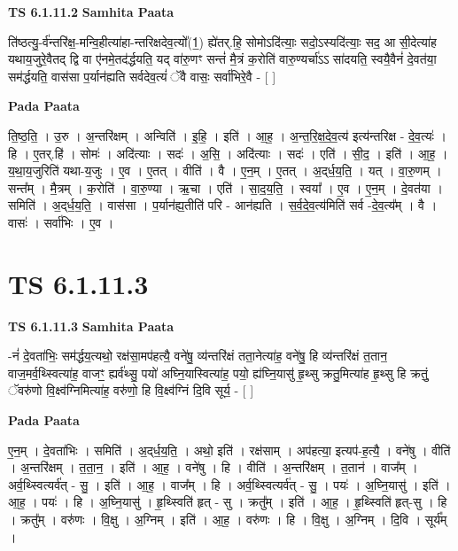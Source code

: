 \documentclass[17pt]{extarticle}
\begin{document}
\textbf{TS 6.1.11.2 } \newline
\textbf{Samhita Paata} \newline

ति॑ष्ठत्यु॒-र्व॑न्तरि॑क्ष॒-मन्वि॒हीत्या॑हा-न्तरिक्षदेव॒त्यो᳚(1॒) ह्ये॑तर्.हि॒ सोमोऽदि॑त्याः॒ सदो॒ऽस्यदि॑त्याः॒ सद॒ आ सी॒देत्या॑ह यथाय॒जुरे॒वैतद् द्वि वा ए॑नमे॒तद॑र्द्धयति॒ यद् वा॑रु॒णꣳ सन्तं॑ मै॒त्रं क॒रोति॑ वारु॒ण्यर्चा॑ऽऽ सा॑दयति॒ स्वयै॒वैनं॑ दे॒वत॑या॒ सम॑र्द्धयति॒ वास॑सा प॒र्यान॑ह्यति सर्वदेव॒त्यं॑ ॅवै वासः॒ सर्वा॑भिरे॒वै - [  ] \newline

\textbf{Pada Paata} \newline

ति॒ष्ठ॒ति॒ । उ॒रु । अ॒न्तरि॑क्षम् । अन्विति॑ । इ॒हि॒ । इति॑ । आ॒ह॒ । अ॒न्त॒रि॒क्ष॒दे॒व॒त्य॑ इत्य॑न्तरिक्ष - दे॒व॒त्यः॑ । हि । ए॒तर्.हि॑ । सोमः॑ । अदि॑त्याः । सदः॑ । अ॒सि॒ । अदि॑त्याः । सदः॑ । एति॑ । सी॒द॒ । इति॑ । आ॒ह॒ । य॒था॒य॒जुरिति॑ यथा-य॒जुः । ए॒व । ए॒तत् । वीति॑ । वै । ए॒न॒म् । ए॒तत् । अ॒द्‌र्ध॒य॒ति॒ । यत् । वा॒रु॒णम् । सन्त᳚म् । मै॒त्रम् । क॒रोति॑ । वा॒रु॒ण्या । ऋ॒चा । एति॑ । सा॒द॒य॒ति॒ । स्वया᳚ । ए॒व । ए॒न॒म् । दे॒वत॑या । समिति॑ । अ॒द्‌र्ध॒य॒ति॒ । वास॑सा । प॒र्यान॑ह्य॒तीति॑ परि - आन॑ह्यति । स॒र्व॒दे॒व॒त्य॑मिति॑ सर्व -दे॒व॒त्य᳚म् । वै । वासः॑ । सर्वा॑भिः । ए॒व ।  \newline




\section*{ TS 6.1.11.3 }

\textbf{TS 6.1.11.3 } \newline
\textbf{Samhita Paata} \newline

-नं॑ दे॒वता॑भिः॒ सम॑र्द्धय॒त्यथो॒ रक्ष॑सा॒मप॑हत्यै॒ वने॑षु॒ व्य॑न्तरि॑क्षं तता॒नेत्या॑ह॒ वने॑षु॒ हि व्य॑न्तरि॑क्षं त॒तान॒ वाज॒मर्व॒थ्स्वित्या॑ह॒ वाजꣳ॒॒ ह्यर्व॑थ्सु॒ पयो॑ अघ्नि॒यास्वित्या॑ह॒ पयो॒ ह्य॑घ्नि॒यासु॑ हृ॒थ्सु क्रतु॒मित्या॑ह हृ॒थ्सु हि क्रतुं॒ ॅवरु॑णो वि॒क्ष्व॑ग्निमित्या॑ह॒ वरु॑णो॒ हि वि॒क्ष्व॑ग्निं दि॒वि सूर्य॒ - [  ] \newline

\textbf{Pada Paata} \newline

ए॒न॒म् । दे॒वता॑भिः । समिति॑ । अ॒द्‌र्ध॒य॒ति॒ । अथो॒ इति॑ । रक्ष॑साम् । अप॑हत्या॒ इत्यप॑-ह॒त्यै॒ । वने॑षु । वीति॑ । अ॒न्तरि॑क्षम् । त॒ता॒न॒ । इति॑ । आ॒ह॒ । वने॑षु । हि । वीति॑ । अ॒न्तरि॑क्षम् । त॒तान॑ । वाज᳚म् । अर्व॒थ्स्वित्यर्व॑त् - सु॒ । इति॑ । आ॒ह॒ । वाज᳚म् । हि । अर्व॒थ्स्वित्यर्व॑त् - सु॒ । पयः॑ । अ॒घ्नि॒यासु॑ । इति॑ । आ॒ह॒ । पयः॑ । हि । अ॒घ्नि॒यासु॑ । हृ॒थ्स्विति॑ हृत् - सु । क्रतु᳚म् । इति॑ । आ॒ह॒ । हृ॒थ्स्विति॑ हृत्-सु । हि । क्रतु᳚म् । वरु॑णः । वि॒क्षु । अ॒ग्निम् । इति॑ । आ॒ह॒ । वरु॑णः । हि । वि॒क्षु । अ॒ग्निम् । दि॒वि । सूर्य᳚म् ।  \newline
\end{document}
